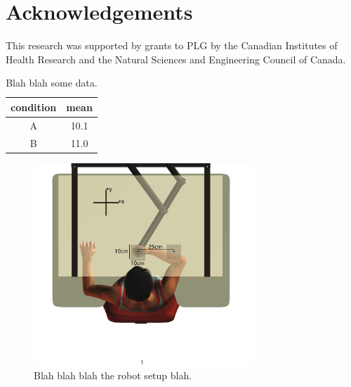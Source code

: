 \documentclass[letterpaper,12pt]{article}
\begin{document}
\lipsum[1-8]


\newpage
\section*{Acknowledgements}
This research was supported by grants to PLG by the Canadian Institutes of Health Research and the Natural Sciences and Engineering Council of Canada.


\newpage
\nolinenumbers

 
%



\newpage
\clearpage
\parbox[c][\textheight][s]{\linewidth}{%
\begin{table}[H]
	\centering
	\begin{tabular}{c|c}
		condition &mean\\
		\hline\hline
		A         &10.1\\
		B         &11.0\\
	\end{tabular}
 \caption{Blah blah some data.}
 \label{tbl:somedata}
\end{table}
}


\newpage
\clearpage
\parbox[c][\textheight][s]{\linewidth}{%
\begin{figure}[H]
	\centering
    \includegraphics[height=3in]{figure1.pdf}
 \caption{Blah blah blah the robot setup blah.}
 \label{fig:setupfig}
\end{figure}
}
\end{document}
